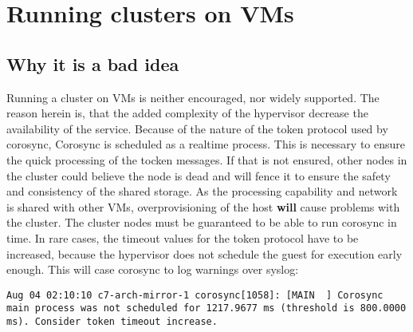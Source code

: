 \section{Running clusters on \acp{VM}}
\subsection{Why it is a bad idea}
Running a cluster on \acp{VM} is neither encouraged, nor widely supported.
The reason herein is, that the added complexity of the hypervisor decrease the availability
of the service. Because of the nature of the token protocol used by corosync,
Corosync is scheduled as a realtime process. This is necessary to ensure the quick
processing of the tocken messages. If that is not ensured, other nodes
in the cluster could believe the node is dead and will fence it to ensure the safety
and consistency of the shared storage.
As the processing capability and network is shared with other \acp{VM},
overprovisioning of the host \textbf{will} cause problems with the cluster.
The cluster nodes must be guaranteed to be able to run corosync in time.
In rare cases, the timeout values for the token protocol have to be increased,
because the hypervisor does not schedule the guest for execution early enough.
This will case corosync to log warnings over syslog:
\begin{lstlisting}
Aug 04 02:10:10 c7-arch-mirror-1 corosync[1058]: [MAIN  ] Corosync main process was not scheduled for 1217.9677 ms (threshold is 800.0000 ms). Consider token timeout increase.
\end{lstlisting}

